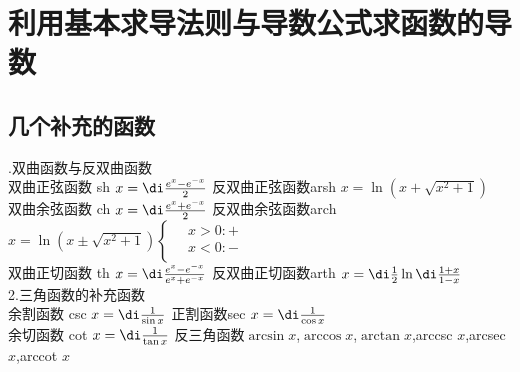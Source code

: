 \section{利用基本求导法则与导数公式求函数的导数}
\subsection{几个补充的函数}\vspace*{0.5em}
.\enspace 双曲函数与反双曲函数\vspace*{1em}\\
双曲正弦函数 \kg sh $x=\di\frac{e^x-e^{-x}}{2}$  \kg \kg 反双曲正弦函数\kg arsh $x=\ln(x+\sqrt{x^2+1})$\vspace*{1em}\\
双曲余弦函数 \kg ch $x=\di\frac{e^x+e^{-x}}{2}$  \kg \kg 反双曲余弦函数\kg arch $x=\ln(x\pm\sqrt{x^2+1})\left\{\begin{aligned}
		&  \, x>0:+\\
		&  \, x<0:-\\
		\end{aligned}\right.
		$\vspace*{1em}\\
双曲正切函数 \kg th $x=\di\frac{e^x-e^{-x}}{e^x+e^{-x}}$  \kg \kg 反双曲正切函数\kg arth $x=\di\frac{1}{2}\ln\di\frac{1+x}{1-x}$\vspace*{1em}\\
2.\enspace 三角函数的补充函数\vspace*{1em}\\
余割函数 \kg csc $x=\di\frac{1}{\sin x}$  \kg \kg 正割函数\kg sec $x=\di\frac{1}{\cos x}$\vspace*{1em}\\
余切函数 \kg cot $x=\di\frac{1}{\tan x}$  \kg \kg 反三角函数\kg  $\arcsin x$,$\arccos x$,$\arctan x$,arccsc $x$,arcsec $x$,arccot $x$
